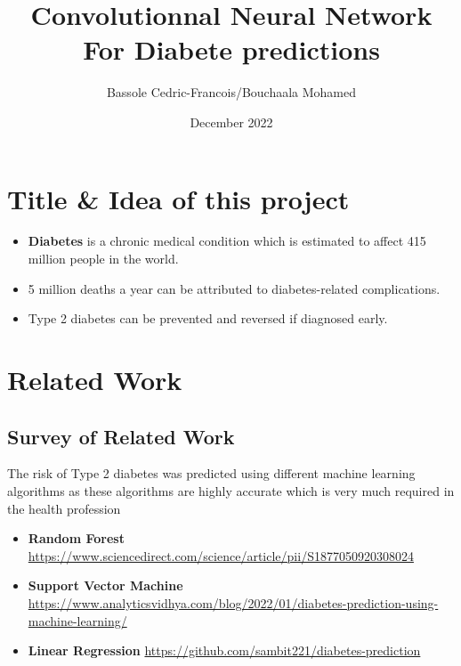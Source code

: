 \documentclass[rnd]{mas_proposal}
\title{Convolutionnal Neural Network For Diabete predictions}
\author{Bassole Cedric-Francois/Bouchaala Mohamed}
\date{December 2022}
\begin{document}
\maketitle

\pagestyle{plain}

\section{Title \& Idea of this project}
\begin{itemize}
    \item\textbf{Diabetes} is a chronic medical condition which is estimated to affect 415 million people in the world.
    \item 5 million deaths a year can be attributed to diabetes-related complications.
    \item Type 2 diabetes can be prevented and reversed if diagnosed early.\\
   \end{itemize}


\section{Related Work}

\subsection{Survey of Related Work}
The risk of Type 2 diabetes was predicted using different machine learning algorithms as these algorithms are highly accurate which is very much required in the health profession
\begin{itemize}
    \item \textbf{Random Forest} \url{https://www.sciencedirect.com/science/article/pii/S1877050920308024}
      \item \textbf{Support Vector Machine} \url{https://www.analyticsvidhya.com/blog/2022/01/diabetes-prediction-using-machine-learning/}
      \item \textbf{Linear Regression} \url{https://github.com/sambit221/diabetes-prediction}

    \end{itemize}
\end{document}
